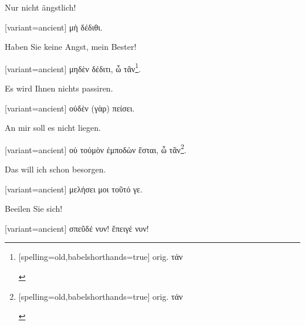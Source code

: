 Nur nicht ängstlich! 

\switchcolumn

\begin{greek}[variant=ancient]%
μὴ δέδιθι.

\end{greek}%
\switchcolumn*

Haben Sie keine Angst, mein Bester! 

\switchcolumn

\begin{greek}[variant=ancient]%
μηδὲν δέδιτι, ὦ τᾶν\footnote{\begin{german}[spelling=old,babelshorthands=true]%
orig. \textgreek[variant=ancient]{τάν}\end{german}%
}.

\end{greek}%
\switchcolumn*

Es wird Ihnen nichts passiren. 

\switchcolumn

\begin{greek}[variant=ancient]%
οὐδὲν (γὰρ) πείσει.

\end{greek}%
\switchcolumn*

An mir soll es nicht liegen. 

\switchcolumn

\begin{greek}[variant=ancient]%
οὐ τοὐμὸν ἐμποδὼν ἔσται, ὦ τᾶν\footnote{\begin{german}[spelling=old,babelshorthands=true]%
orig. \textgreek[variant=ancient]{τάν}\end{german}%
}.

\end{greek}%
\switchcolumn*

Das will ich schon besorgen. 

\switchcolumn

\begin{greek}[variant=ancient]%
μελήσει μοι τοῦτό γε.

\end{greek}%
Beeilen Sie sich! 

\switchcolumn

\begin{greek}[variant=ancient]%
σπεῦδέ νυν! ἔπειγέ νυν!

\end{greek}%
\switchcolumn*

